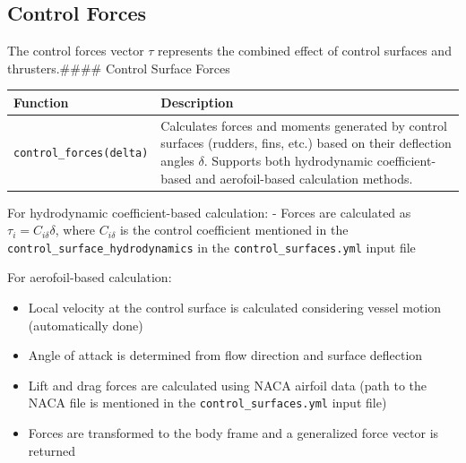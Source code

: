 \documentclass[
  letterpaper,
  DIV=11,
  numbers=noendperiod]{scrreprt}
\providecommand{\tightlist}{%
  \setlength{\itemsep}{0pt}\setlength{\parskip}{0pt}}\usepackage{longtable,booktabs,array}
\begin{document}
\subsection*{Control Forces}\label{control-forces}

The control forces vector \(\tau\) represents the combined effect of
control surfaces and thrusters.\#\#\#\# Control Surface Forces

\begin{longtable}[]{@{}
  >{\raggedright\arraybackslash}p{}
  >{\raggedright\arraybackslash}p{}@{}}
\toprule\noalign{}
\begin{minipage}[b]{\linewidth}\raggedright
Function
\end{minipage} & \begin{minipage}[b]{\linewidth}\raggedright
Description
\end{minipage} \\
\midrule\noalign{}
\endhead
\bottomrule\noalign{}
\endlastfoot
\texttt{control\_forces(delta)} & Calculates forces and moments
generated by control surfaces (rudders, fins, etc.) based on their
deflection angles \(\delta\). Supports both hydrodynamic
coefficient-based and aerofoil-based calculation methods. \\
\end{longtable}

For hydrodynamic coefficient-based calculation: - Forces are calculated
as \(\tau_i = C_{i\delta} \delta\), where \(C_{i\delta}\) is the control
coefficient mentioned in the \texttt{control\_surface\_hydrodynamics} in
the \texttt{control\_surfaces.yml} input file

For aerofoil-based calculation:

\begin{itemize}
\tightlist
\item
  Local velocity at the control surface is calculated considering vessel
  motion (automatically done)
\item
  Angle of attack is determined from flow direction and surface
  deflection
\item
  Lift and drag forces are calculated using NACA airfoil data (path to
  the NACA file is mentioned in the \texttt{control\_surfaces.yml} input
  file)
\item
  Forces are transformed to the body frame and a generalized force
  vector is returned
\end{itemize}
\end{document}
